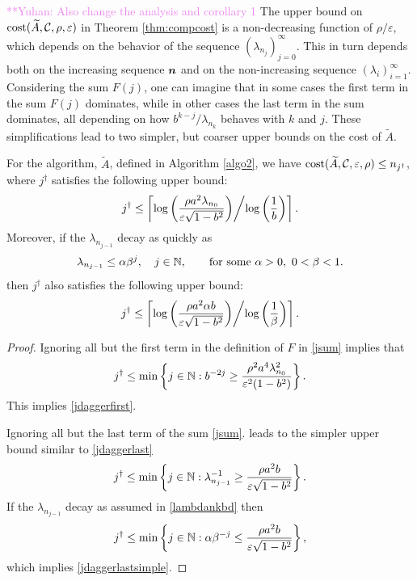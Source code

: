 \documentclass[graybox,footinfo]{svmult}
\newcommand{\yuhannote}[1]{ {\textcolor{violet}  {\mbox{**Yuhan:} #1}}}
\begin{document}
\yuhannote{Also change the analysis and corollary 1}
The upper bound on $\textup{cost}(\widetilde{A},{\mathcal{C}},\rho,\varepsilon)$ in Theorem \ref{thm:compcost}  is a non-decreasing function of $\rho/\varepsilon$, which depends on the behavior of the sequence $(\lambda_{n_j})_{j=0}^\infty$.  This in turn depends both on the increasing sequence ${\boldsymbol{n}}$ and on the non-increasing sequence $(\lambda_i)_{i=1}^\infty$. Considering the sum $F(j)$,
one can imagine that in some cases the first term in the sum $F(j)$ dominates, while in other cases the last term in the sum dominates, all depending on how $b^{k-j}/\lambda_{n_{k}}$ behaves with $k$ and $j$.  These simplifications lead to two simpler, but coarser upper bounds on the cost of $\widetilde{A}$.

\begin{corollary} For the algorithm, $\widetilde{A}$, defined in Algorithm \ref{algo2}, we have $\textup{cost}(\widetilde{A},{\mathcal{C}},\varepsilon,\rho) \le n_{j^\dagger}$, where $j^\dagger$ satisfies the following upper bound:
\begin{equation} \label{jdaggerfirst}
j^\dagger \le \left \lceil \log\left(\frac{\rho a^2\lambda_{n_{0}} }{\varepsilon \sqrt{1 - b^2}}\right) \middle/ \log\left(\frac{1}{b}\right) \right \rceil.
\end{equation}
Moreover, if the $\lambda_{n_{j-1}}$ decay as quickly as
\begin{equation}
\label{lambdankbd}
\lambda_{n_{j-1}} \le \alpha \beta^j,  \quad j \in \bbN,  \qquad \text{for some } \alpha > 0, \ 0 < \beta < 1.
\end{equation}
then $j^\dagger$ also satisfies the following upper bound:
\begin{equation}
\label{jdaggerlastsimple}
j^\dagger \le
\left \lceil \log\left(\frac{\rho a^2\alpha b }{\varepsilon \sqrt{1 - b^2}}\right) \middle/ \log\left(\frac{1}{\beta}\right) \right \rceil.
\end{equation}
\end{corollary}

\begin{proof}
Ignoring all but the first term in the definition of $F$ in \eqref{jsum} implies that 
\begin{equation*} \label{jsumupperbd}
j^\dagger \le \min \left \{j \in \bbN : b^{-2j}  \ge  \frac{\rho^2 a^4 \lambda_{n_{0}}^2 }{\varepsilon^2(1 - b^2)} \right\}.
\end{equation*}
This implies \eqref{jdaggerfirst}.

Ignoring all but the last term of the sum \eqref{jsum}. leads to the simpler upper bound similar to  \eqref{jdaggerlast}
\begin{equation*} 
j^\dagger \le \min \left \{j \in {\mathbb{N}} :  \lambda_{n_{j-1}}^{-1} \ge \frac{ \rho a^2b}{ \varepsilon\sqrt{1 - b^2}} \right\}.
\end{equation*}
If the $\lambda_{n_{j-1}}$ decay as assumed in \eqref{lambdankbd} then
\[
j^\dagger \le \min \left \{j \in {\mathbb{N}} :  \alpha \beta^{-j} \le \frac{\rho a^2b }{ \varepsilon\sqrt{1 - b^2}} \right\},
\]
which implies \eqref{jdaggerlastsimple}.
\end{proof}
\end{document}
